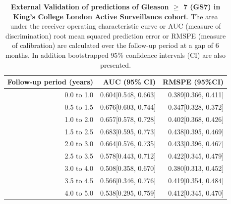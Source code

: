 \begin{table}[!htb]
\small\sf\centering
\caption{\textbf{External Validation of predictions of Gleason $\geq$ 7 (GS7) in King's College London Active Surveillance cohort}. The area under the receiver operating characteristic curve or AUC (measure of discrimination) root mean squared prediction error or RMSPE (measure of calibration) are calculated over the follow-up period at a gap of 6 months. In addition bootstrapped 95\% confidence intervals (CI) are also presented.}
\label{tab:AUC_PE_KCL}
\begin{tabular}{r|r|r}
\hline
\hline
Follow-up period (years) & AUC (95\% CI) & RMSPE (95\%CI)\\ 
\hline
0.0 to 1.0 & 0.604[0.548, 0.663] & 0.389[0.366, 0.411]\\
0.5 to 1.5 & 0.676[0.603, 0.744] & 0.347[0.328, 0.372]\\
1.0 to 2.0 & 0.657[0.578, 0.728] & 0.402[0.368, 0.426]\\
1.5 to 2.5 & 0.683[0.595, 0.773] & 0.438[0.395, 0.469]\\
2.0 to 3.0 & 0.664[0.576, 0.735] & 0.433[0.396, 0.467]\\
2.5 to 3.5 & 0.578[0.443, 0.712] & 0.422[0.345, 0.479]\\
3.0 to 4.0 & 0.508[0.358, 0.670] & 0.380[0.313, 0.452]\\
3.5 to 4.5 & 0.566[0.346, 0.776] & 0.419[0.354, 0.484]\\
4.0 to 5.0 & 0.538[0.295, 0.759] & 0.412[0.345, 0.470]\\
\hline
\end{tabular}	
\end{table}